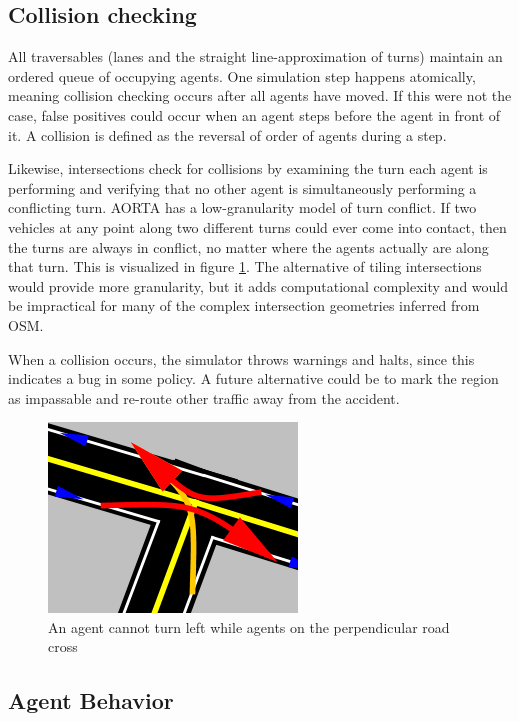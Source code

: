 \documentclass[letterpaper, 10 pt, conference]{ieeeconf}  %
\begin{document}
\subsection{Collision checking}

All traversables (lanes and the straight line-approximation of turns) maintain
an ordered queue of occupying agents. One simulation step happens atomically,
meaning collision checking occurs after all agents have moved. If this were not
the case, false positives could occur when an agent steps before the agent in front
of it. A collision is defined as the reversal of order of agents during a step.

Likewise, intersections check for collisions by examining the turn each agent is
performing and verifying that no other agent is simultaneously performing a
conflicting turn. AORTA has a low-granularity model of turn conflict. If two
vehicles at any point along two different turns could ever come into contact,
then the turns are always in conflict, no matter where the agents actually are
along that turn. This is visualized in figure \ref{fig:conflicts}. The
alternative of tiling intersections \cite{JAIR08-dresner} would provide more
granularity, but it adds computational complexity and would be impractical for
many of the complex intersection geometries inferred from OSM.

When a collision occurs, the simulator throws warnings and halts, since this
indicates a bug in some policy. A future alternative could be to mark the region
as impassable and re-route other traffic away from the accident.

\begin{figure}[h]
  \centering \includegraphics[scale=0.5]{turn_conflicts.png}
  \caption{An agent cannot turn left while agents on the perpendicular road cross}
  \label{fig:conflicts}
  \vspace{-15pt}
\end{figure}

\subsection{Agent Behavior}
\label{sec:behaviors}
\end{document}
